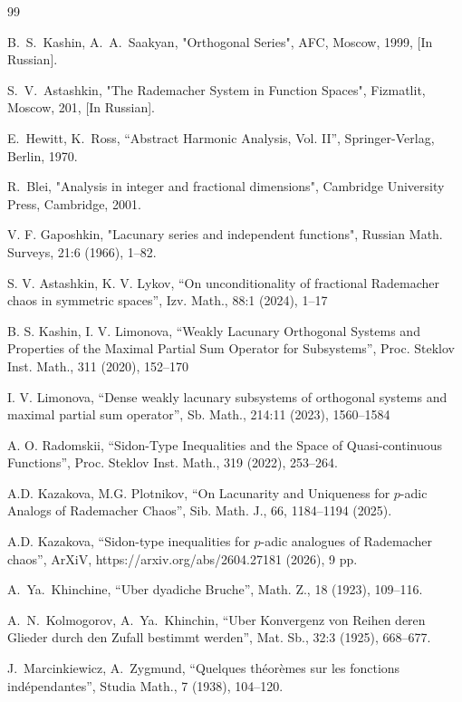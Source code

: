 \documentclass[12pt]{article}
\begin{document}
	\begin{thebibliography}{99}
		
		B.~S.~Kashin, A.~A.~Saakyan, "Orthogonal Series", AFC, Moscow, 1999, [In Russian].
		
		S.~V.~Astashkin, "The Rademacher System in Function Spaces", Fizmatlit, Moscow, 201, [In Russian].
		
		E.~Hewitt, K.~Ross, “Abstract Harmonic Analysis, Vol. II”, Springer-Verlag, Berlin, 1970.
		
		R.~Blei, "Analysis in integer and fractional dimensions", Cambridge University Press, Cambridge, 2001.
		
		 V. F. Gaposhkin, "Lacunary series and independent functions", Russian Math. Surveys, 21:6 (1966), 1–82.
		
		S. V. Astashkin, K. V. Lykov, “On unconditionality of fractional Rademacher chaos in symmetric spaces”, Izv. Math., 88:1 (2024), 1–17 
		
		B. S. Kashin, I. V. Limonova, “Weakly Lacunary Orthogonal Systems and Properties of the Maximal Partial Sum Operator for Subsystems”, Proc. Steklov Inst. Math., 311 (2020), 152–170
		
		I. V. Limonova, “Dense weakly lacunary subsystems of orthogonal systems and maximal partial sum operator”, Sb. Math., 214:11 (2023), 1560–1584
		
		A. O. Radomskii, “Sidon-Type Inequalities and the Space of Quasi-continuous Functions”, Proc. Steklov Inst. Math., 319 (2022), 253–264.
		
		A.D. Kazakova, M.G. Plotnikov, “On Lacunarity and Uniqueness for 
		$p$-adic Analogs of Rademacher Chaos”, Sib. Math. J., 66, 1184–1194 (2025).
			
		 A.D. Kazakova, “Sidon-type inequalities for $p$-adic analogues of Rademacher chaos”, ArXiV, https://arxiv.org/abs/2604.27181 (2026), 9 pp.

		A.~Ya.~Khinchine, “Uber dyadiche Bruche”, Math. Z., 18 (1923), 109–116.
		
		A.~N.~Kolmogorov, A.~Ya.~Khinchin, “Uber Konvergenz von Reihen deren Glieder durch den Zufall bestimmt werden”,  Mat. Sb., 32:3 (1925), 668–677.
		
		J.~Marcinkiewicz, A.~Zygmund, “Quelques théorèmes sur les fonctions indépendantes”, Studia Math., 7 (1938), 104–120.
		

\end{thebibliography}
\end{document}
